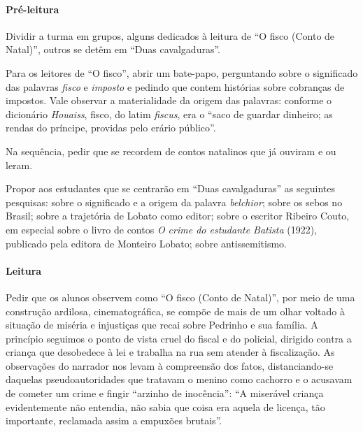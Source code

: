 \documentclass[11pt]{extarticle}
\begin{document}
\asterisc\paragraph{Pré-leitura}

Dividir a turma em grupos, alguns dedicados à leitura de ``O fisco
(Conto de Natal)'', outros se detêm em ``Duas cavalgaduras''.

Para os leitores de ``O fisco'', abrir um bate-papo, perguntando sobre o
significado das palavras \emph{fisco} e \emph{imposto} e pedindo que
contem histórias sobre cobranças de impostos. Vale observar a
materialidade da origem das palavras: conforme o dicionário
\emph{Houaiss}, fisco, do latim \emph{fiscus}, era o ``saco de guardar
dinheiro; as rendas do príncipe, providas pelo erário público''.

Na sequência, pedir que se recordem de contos natalinos que já ouviram e
ou leram.

Propor aos estudantes que se centrarão em ``Duas cavalgaduras'' as
seguintes pesquisas: sobre o significado e a origem da palavra
\emph{belchior}; sobre os sebos no Brasil; sobre a trajetória de Lobato
como editor; sobre o escritor Ribeiro Couto, em especial sobre o livro
de contos \emph{O crime do estudante Batista} (1922), publicado pela
editora de Monteiro Lobato; sobre antissemitismo.

\asterisc\paragraph{Leitura}


Pedir que os alunos observem como ``O fisco (Conto de Natal)'', por meio
de uma construção ardilosa, cinematográfica, se compõe de mais de um
olhar voltado à situação de miséria e injustiças que recai sobre
Pedrinho e sua família. A princípio seguimos o ponto de vista cruel do
fiscal e do policial, dirigido contra a criança que desobedece à lei e
trabalha na rua sem atender à fiscalização. As observações do narrador
nos levam à compreensão dos fatos, distanciando-se daquelas
pseudoautoridades que tratavam o menino como cachorro e o acusavam de
cometer um crime e fingir ``arzinho de inocência'': ``A miserável
criança evidentemente não entendia, não sabia que coisa era aquela de
licença, tão importante, reclamada assim a empuxões brutais''.
\end{document}
